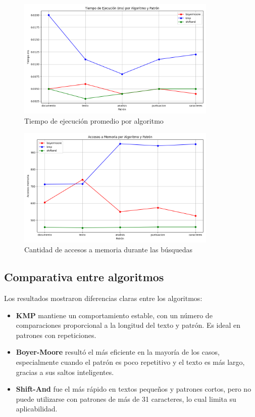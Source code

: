 \documentclass[9pt,letterpaper,onecolumn]{rho-class/rho}
\begin{document}
\begin{figure}[H]
\centering
\includegraphics[width=0.85\textwidth]{grafico_tiempo_ms.png}
\caption{Tiempo de ejecución promedio por algoritmo}
\end{figure}

\begin{figure}[H]
\centering
\includegraphics[width=0.85\textwidth]{grafico_accesos_memoria.png}
\caption{Cantidad de accesos a memoria durante las búsquedas}
\end{figure}

\subsection{Comparativa entre algoritmos}

Los resultados mostraron diferencias claras entre los algoritmos:

\begin{itemize}
    \item \textbf{KMP} mantiene un comportamiento estable, con un número de comparaciones proporcional a la longitud del texto y patrón. Es ideal en patrones con repeticiones.
    \item \textbf{Boyer-Moore} resultó el más eficiente en la mayoría de los casos, especialmente cuando el patrón es poco repetitivo y el texto es más largo, gracias a sus saltos inteligentes.
    \item \textbf{Shift-And} fue el más rápido en textos pequeños y patrones cortos, pero no puede utilizarse con patrones de más de 31 caracteres, lo cual limita su aplicabilidad.
\end{itemize}
\end{document}
